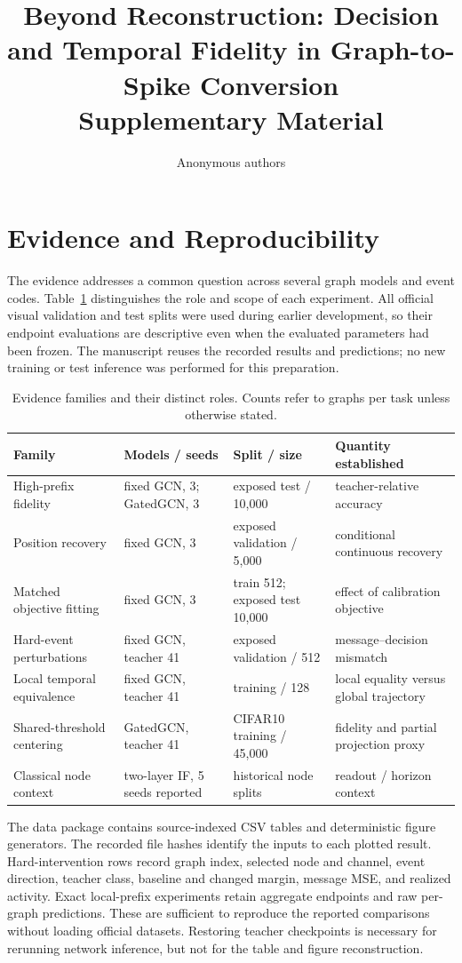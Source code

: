 \documentclass[10pt,twocolumn,letterpaper]{article}
\title{Beyond Reconstruction: Decision and Temporal Fidelity in Graph-to-Spike Conversion\\Supplementary Material}
\author{Anonymous authors}
\begin{document}
\maketitle
\section{Evidence and Reproducibility}
The evidence addresses a common question across several graph models and event codes. Table~\ref{tab:scope} distinguishes the role and scope of each experiment. All official visual validation and test splits were used during earlier development, so their endpoint evaluations are descriptive even when the evaluated parameters had been frozen. The manuscript reuses the recorded results and predictions; no new training or test inference was performed for this preparation.

\begin{table}[t]\centering\small
\caption{Evidence families and their distinct roles. Counts refer to graphs per task unless otherwise stated.}
\label{tab:scope}
\setlength{\tabcolsep}{5pt}\begin{tabular}{llll}\toprule
Family & Models / seeds & Split / size & Quantity established\\\midrule
High-prefix fidelity & fixed GCN, 3; GatedGCN, 3 & exposed test / 10,000 & teacher-relative accuracy\\
Position recovery & fixed GCN, 3 & exposed validation / 5,000 & conditional continuous recovery\\
Matched objective fitting & fixed GCN, 3 & train 512; exposed test 10,000 & effect of calibration objective\\
Hard-event perturbations & fixed GCN, teacher 41 & exposed validation / 512 & message--decision mismatch\\
Local temporal equivalence & fixed GCN, teacher 41 & training / 128 & local equality versus global trajectory\\
Shared-threshold centering & GatedGCN, teacher 41 & CIFAR10 training / 45,000 & fidelity and partial projection proxy\\
Classical node context & two-layer IF, 5 seeds reported & historical node splits & readout / horizon context\\\bottomrule
\end{tabular}\end{table}

The data package contains source-indexed CSV tables and deterministic figure generators. The recorded file hashes identify the inputs to each plotted result. Hard-intervention rows record graph index, selected node and channel, event direction, teacher class, baseline and changed margin, message MSE, and realized activity. Exact local-prefix experiments retain aggregate endpoints and raw per-graph predictions. These are sufficient to reproduce the reported comparisons without loading official datasets. Restoring teacher checkpoints is necessary for rerunning network inference, but not for the table and figure reconstruction.
\end{document}
